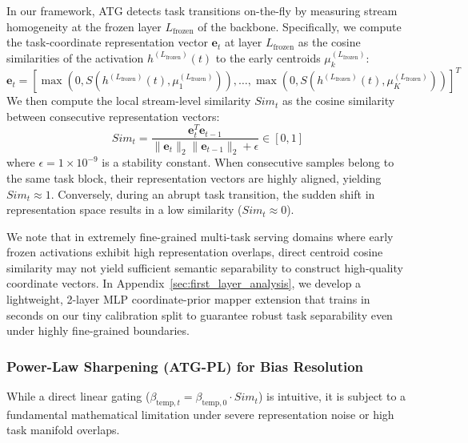 In our framework, ATG detects task transitions on-the-fly by measuring stream homogeneity at the frozen layer $L_{\text{frozen}}$ of the backbone. Specifically, we compute the task-coordinate representation vector $\mathbf{e}_t$ at layer $L_{\text{frozen}}$ as the cosine similarities of the activation $h^{(L_{\text{frozen}})}(t)$ to the early centroids $\mu_k^{(L_{\text{frozen}})}$:
\begin{equation}
    \mathbf{e}_t = \left[ \max\left(0, S\left(h^{(L_{\text{frozen}})}(t), \mu_1^{(L_{\text{frozen}})}\right)\right), \dots, \max\left(0, S\left(h^{(L_{\text{frozen}})}(t), \mu_K^{(L_{\text{frozen}})}\right)\right) \right]^T
\end{equation}
We then compute the local stream-level similarity $Sim_t$ as the cosine similarity between consecutive representation vectors:
\begin{equation}
    Sim_t = \frac{\mathbf{e}_t^T \mathbf{e}_{t-1}}{\|\mathbf{e}_t\|_2 \|\mathbf{e}_{t-1}\|_2 + \epsilon} \in [0, 1]
\end{equation}
where $\epsilon = 1\times 10^{-9}$ is a stability constant. When consecutive samples belong to the same task block, their representation vectors are highly aligned, yielding $Sim_t \approx 1$. Conversely, during an abrupt task transition, the sudden shift in representation space results in a low similarity ($Sim_t \approx 0$).

We note that in extremely fine-grained multi-task serving domains where early frozen activations exhibit high representation overlaps, direct centroid cosine similarity may not yield sufficient semantic separability to construct high-quality coordinate vectors. In Appendix~\ref{sec:first_layer_analysis}, we develop a lightweight, 2-layer MLP coordinate-prior mapper extension that trains in seconds on our tiny calibration split to guarantee robust task separability even under highly fine-grained boundaries.

\subsubsection{Power-Law Sharpening (ATG-PL) for Bias Resolution}
While a direct linear gating ($\beta_{\text{temp}, t} = \beta_{\text{temp}, 0} \cdot Sim_t$) is intuitive, it is subject to a fundamental mathematical limitation under severe representation noise or high task manifold overlaps. 

